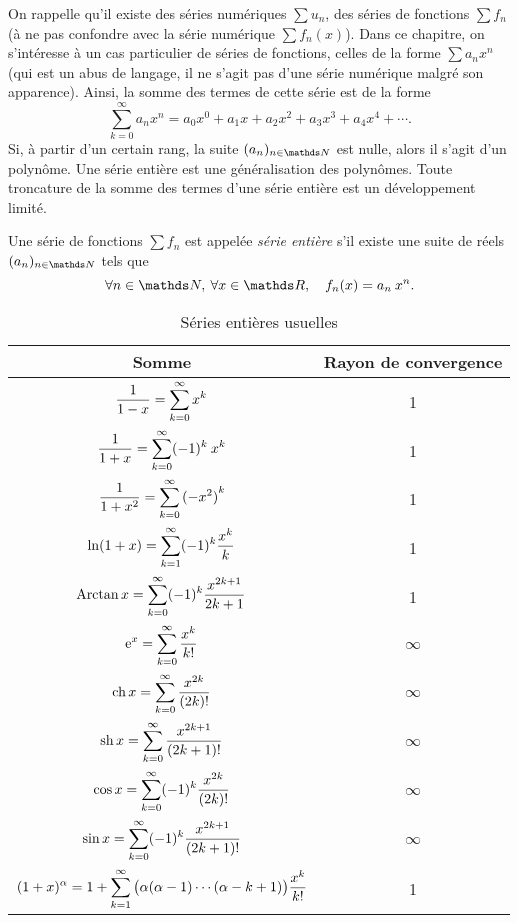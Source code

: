 On rappelle qu'il existe des séries numériques $\sum u_n$, des séries de fonctions $\sum f_n$\/ (à ne pas confondre avec la série numérique $\sum f_n(x)$). Dans ce chapitre, on s'intéresse à un cas particulier de séries de fonctions, celles de la forme $\sum a_n x^n$\/ (qui est un abus de langage, il ne s'agit pas d'une série numérique malgré son apparence). Ainsi, la somme des termes de cette série est de la forme \[
	\sum_{k=0}^\infty a_n x^n = a_0 x^0 + a_1 x + a_2 x^2 + a_3x^3 + a_4 x^4 + \cdots
.\]
Si, à partir d'un certain rang, la suite $(a_n)_{n\in\N}$\/ est nulle, alors il s'agit d'un polynôme. Une série entière est une généralisation des polynômes. Toute troncature de la somme des termes d'une série entière est un développement limité.

\begin{defn}
	Une série de fonctions $\sum f_n$\/ est appelée \textit{série entière} s'il existe une suite de réels $(a_n)_{n\in\N}$\/ tels que  \[
		\forall n \in \N,\:\forall x \in \R,\quad f_n(x) = a_n\:x^n
	.\]
\end{defn}

\begin{table}[H]
	\centering
	\begin{tabular}{|c|c|}\hline
		\textbf{Somme} & \textbf{Rayon de convergence}\\ \hline \hline
		$\displaystyle\frac{1}{1-x} = \sum_{k=0}^\infty x^k$\/ & 1\\
		$\displaystyle\frac{1}{1+x} = \sum_{k=0}^\infty (-1)^k\:x^k$\/ & 1\\
		$\displaystyle\frac{1}{1+x^2} = \sum_{k=0}^\infty {(-x^2)}^k$\/ & 1\\
		$\displaystyle\ln(1+x) = \sum_{k=1}^\infty (-1)^k \frac{x^k}{k}$\/ & 1\\
		$\displaystyle \operatorname{Arctan} x = \sum_{k=0}^\infty (-1)^k \frac{x^{2k+1}}{2k+1}$\/ & 1\\
		$\displaystyle \mathrm{e}^{x} = \sum_{k=0}^\infty \frac{x^k}{k!}$\/ & $\infty$\/ \\
		$\displaystyle \operatorname{ch} x = \sum_{k=0}^\infty \frac{x^{2k}}{(2k)!}$\/ & $\infty$\/ \\
		$\displaystyle \operatorname{sh} x = \sum_{k=0}^\infty \frac{x^{2k+1}}{(2k+1)!}$\/ & $\infty$\/ \\
		$\displaystyle \cos x = \sum_{k=0}^\infty (-1)^k \frac{x^{2k}}{(2k)!}$\/ & $\infty$\/ \\
		$\displaystyle \sin x = \sum_{k=0}^\infty (-1)^k \frac{x^{2k+1}}{(2k+1)!}$\/ & $\infty$\/ \\
		$\displaystyle(1+x)^{\alpha} = 1 + \sum_{k=1}^\infty \big(\alpha (\alpha-1)\cdots (\alpha - k + 1)\big) \frac{x^k}{k!}$\/ & 1\\ \hline
	\end{tabular}
	\caption{Séries entières usuelles}
\end{table}

